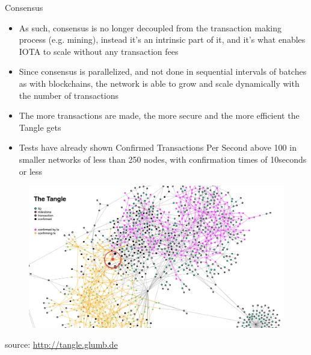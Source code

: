 \documentclass[9pt]{beamer}
\begin{document}

\begin{frame}{Consensus}
	\begin{itemize}
		\item As such, consensus is no longer decoupled from the transaction making process (e.g. mining), instead it's an intrinsic part of it, and it's what enables IOTA to scale without any transaction fees
		\item Since consensus is parallelized, and not done in sequential intervals of batches as with blockchains, the network is able to grow and scale dynamically with the number of transactions
		\item The more transactions are made, the more secure and the more efficient the Tangle gets
		\item Tests have already shown Confirmed Transactions Per Second above 100 in smaller networks of less than 250 nodes, with confirmation times of 10seconds or less
	\end{itemize}
\end{frame}


\begin{frame}{}
	\begin{figure}[]
		\centering
		\includegraphics  [scale=0.3]{Images/tangle}
	\end{figure}
	\begin{scriptsize}
		source: \href{http://tangle.glumb.de}{http://tangle.glumb.de}
	\end{scriptsize}
\end{frame}

\end{document}
